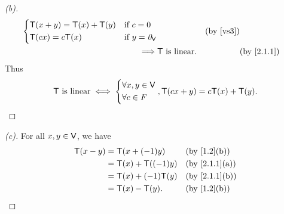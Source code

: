 \begin{proof}[(b)]
\begin{align*}
\begin{dcases}
			                         \T(x + y) = \T(x) + \T(y) & \text{if } c = 0        \\
			                         \T(cx) = c\T(x)           & \text{if } y = \zv_{\V}
		                         \end{dcases}             &  & \text{(by \ref{vs3})}                  \\
		\implies & \T \text{ is linear}.                                              &  & \by{2.1.1}
	\end{align*}
	Thus
	\[
		\mathsf{T} \text{ is linear} \iff \begin{dcases}
			\forall x, y \in \mathsf{V} \\
			\forall c \in \mathit{F}
		\end{dcases}, \mathsf{T}(cx + y) = c\mathsf{T}(x) + \mathsf{T}(y).
	\]
\end{proof}

\begin{proof}[(c)]
	For all \(x, y \in \mathsf{V}\), we have
	\begin{align*}
		\T(x - y) & = \T(x + (-1)y)      &  & \by{1.2}[b]   \\
		          & = \T(x) + \T((-1)y)  &  & \by{2.1.1}[a] \\
		          & = \T(x) + (-1) \T(y) &  & \by{2.1.1}[b] \\
		          & = \T(x) - \T(y).     &  & \by{1.2}[b]
	\end{align*}
\end{proof}

